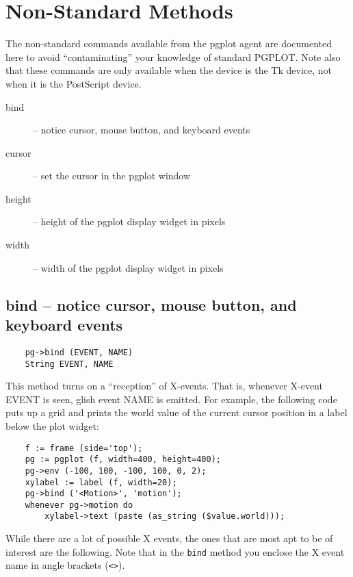 \section{Non-Standard Methods}

The non-standard commands available from the pgplot agent are
documented here to avoid ``contaminating'' your knowledge of standard
PGPLOT.  Note also that these commands are only available when the
device is the Tk device, not when it is the PostScript device.

\begin{description}
\item[bind] -- notice cursor, mouse button, and keyboard events
\item[cursor] -- set the cursor in the pgplot window
\item[height] -- height of the pgplot display widget in pixels
\item[width] -- width of the pgplot display widget in pixels
\end{description}

\subsection*{bind -- notice cursor, mouse button, and keyboard events}

\begin{verbatim}
    pg->bind (EVENT, NAME)
    String EVENT, NAME
\end{verbatim}

This method turns on a ``reception'' of X-events.  That is, whenever
X-event EVENT is seen, glish event NAME is emitted.  For example, the
following code puts up a grid and prints the world value of the
current cursor position in a label below the plot widget:

\begin{verbatim}
    f := frame (side='top');
    pg := pgplot (f, width=400, height=400);
    pg->env (-100, 100, -100, 100, 0, 2);
    xylabel := label (f, width=20);
    pg->bind ('<Motion>', 'motion');
    whenever pg->motion do
        xylabel->text (paste (as_string ($value.world)));
\end{verbatim}

While there are a lot of possible X events, the ones that are most apt
to be of interest are the following.  Note that in the {\tt bind}
method you enclose the X event name in angle brackets ({\tt <>}).


